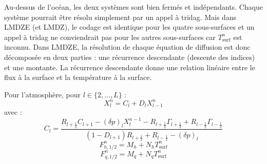 \documentclass[a4paper,english,french]{article}
\begin{document}
Au-dessus de l'océan, les deux systèmes sont bien fermés et
indépendants. Chaque système pourrait être résolu simplement par un
appel à tridag. Mais dans LMDZE (et LMDZ), le codage est identique
pour les quatre sous-surfaces et un appel à tridag ne conviendrait pas
pour les autres sous-surfaces car $T_\mathrm{surf}^n$ est
inconnu. Dans LMDZE, la résolution de chaque équation de diffusion est
donc décomposée en deux parties : une récurrence descendante (descente
des indices) et une montante. La récurrence descendante donne une
relation linéaire entre le flux à la surface et la température à la
surface.

Pour l'atmosphère, pour $l \in \{2, \dots, L\}$ :
\begin{equation*}
  X_l^{n} = C_l + D_l X_{l - 1}^{n}
\end{equation*}
avec :
\begin{equation*}
  C_l
  = \frac
  {
    R_{l + \frac{1}{2}} C_{l + 1} - (\delta p)_l X_l^{n - 1}
    - R_{l + \frac{1}{2}} \Gamma_{l + \frac{1}{2}}
    + R_{l - \frac{1}{2}} \Gamma_{l - \frac{1}{2}}
  }
  {(1 - D_{l + 1}) R_{l + \frac{1}{2}} + R_{l - \frac{1}{2}} - (\delta p)_l}
\end{equation*}
\begin{equation*}
  F_{h, 1/2}^n = M_h + N_h T_\mathrm{surf}^n
\end{equation*}
\begin{equation*}
  F_{q, 1/2}^n = M_q + N_q T_\mathrm{surf}^n
\end{equation*}
\end{document}
